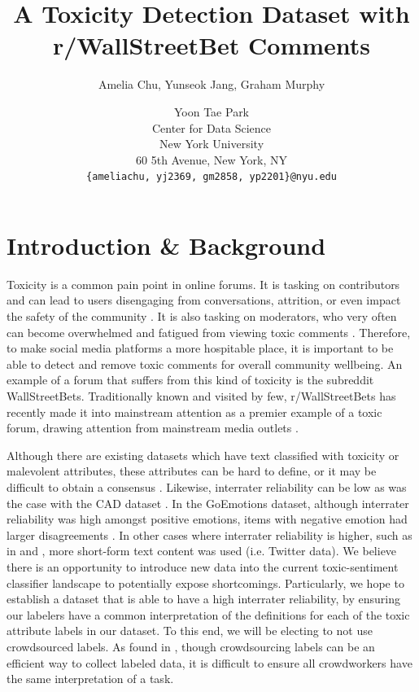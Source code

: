 \documentclass[11pt]{article}
\title{A Toxicity Detection Dataset with r/WallStreetBet Comments}
\author{Amelia Chu, Yunseok Jang, Graham Murphy \and Yoon Tae Park \\
 Center for Data Science \\ New York University \\ 60 5th Avenue, New York, NY \\
  \texttt{\{ameliachu, yj2369, gm2858, yp2201\}@nyu.edu} \\}
\begin{document}
\maketitle


\section{Introduction \& Background}
Toxicity is a common pain point in online forums. It is tasking on contributors and can lead to users disengaging from conversations, attrition, or even impact the safety of the community \citep{vidgen2021, salminen2020}. It is also tasking on moderators, who very often can become overwhelmed and fatigued from viewing toxic comments \citep{almerekhi2020, vidgen2020}.  Therefore, to make social media platforms a more hospitable place, it is important to be able to detect and remove toxic comments for overall community wellbeing.  An example of a forum that suffers from this kind of toxicity is the subreddit WallStreetBets. Traditionally known and visited by few, r/WallStreetBets has recently made it into mainstream attention as a premier example of a toxic forum, drawing attention from mainstream media outlets \citep{harwell2021, hadly2021, mccabe2021}. 

Although there are existing datasets which have text classified with toxicity or malevolent attributes, these attributes can be hard to define, or it may be difficult to obtain a consensus \citep{davidson2017, salminen2018, salminen2019}. Likewise, interrater reliability can be low as was the case with the CAD dataset \citep{vidgen2021}. In the GoEmotions dataset, although interrater reliability was high amongst positive emotions, items with negative emotion had larger disagreements \citep{demszky2020}.  In other cases where interrater reliability is higher, such as in \citet{zhang2021} and \citet{salminen2020}, more short-form text content was used (i.e. Twitter data). We believe there is an opportunity to introduce new data into the current toxic-sentiment classifier landscape to potentially expose shortcomings. Particularly, we hope to establish a dataset that is able to have a high interrater reliability, by ensuring our labelers have a common interpretation of the definitions for each of the toxic attribute labels in our dataset. To this end, we will be electing to not use crowdsourced labels. As found in \citet{vidgen2020}, though crowdsourcing labels can be an efficient way to collect labeled data, it is difficult to ensure all crowdworkers have the same interpretation of a task. 
\end{document}

